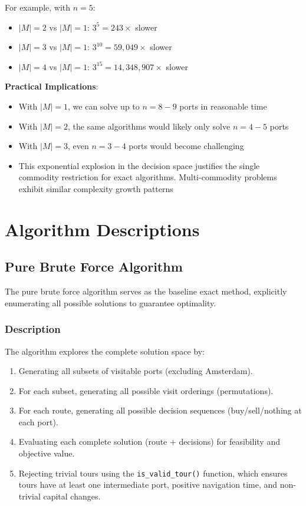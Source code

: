 \documentclass[12pt]{article}
\begin{document}
For example, with $n=5$:
\begin{itemize}
    \item $|M| = 2$ vs $|M| = 1$: $3^5 = 243\times$ slower
    \item $|M| = 3$ vs $|M| = 1$: $3^{10} = 59,049\times$ slower
    \item $|M| = 4$ vs $|M| = 1$: $3^{15} = 14,348,907\times$ slower
\end{itemize}

\textbf{Practical Implications}:
\begin{itemize}
    \item With $|M| = 1$, we can solve up to $n=8-9$ ports in reasonable time
    \item With $|M| = 2$, the same algorithms would likely only solve $n=4-5$ ports
    \item With $|M| = 3$, even $n=3-4$ ports would become challenging
    \item This exponential explosion in the decision space justifies the single commodity restriction for exact algorithms. Multi-commodity problems exhibit similar complexity growth patterns \cite{ahuja1993}
\end{itemize}

\section{Algorithm Descriptions}
\label{sec:algorithms}

\subsection{Pure Brute Force Algorithm}
\label{subsec:pure_bf}

The pure brute force algorithm serves as the baseline exact method, explicitly enumerating all possible solutions to guarantee optimality.

\subsubsection{Description}

The algorithm explores the complete solution space by:
\begin{enumerate}
    \item Generating all subsets of visitable ports (excluding Amsterdam).
    \item For each subset, generating all possible visit orderings (permutations).
    \item For each route, generating all possible decision sequences (buy/sell/nothing at each port).
    \item Evaluating each complete solution (route + decisions) for feasibility and objective value.
    \item Rejecting trivial tours using the \texttt{is\_valid\_tour()} function, which ensures tours have at least one intermediate port, positive navigation time, and non-trivial capital changes.
\end{enumerate}
\end{document}
